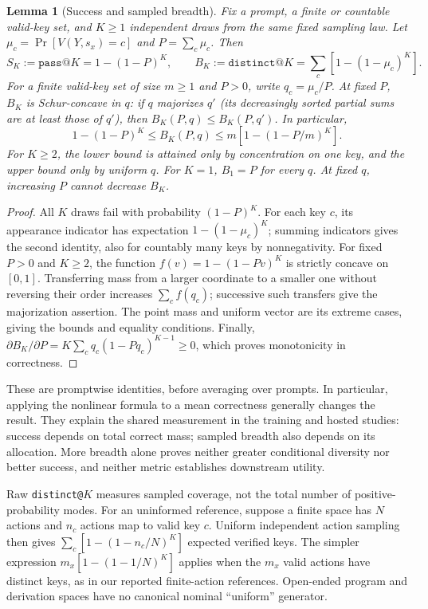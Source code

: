 \documentclass{article}
\newcommand{\1}{\mathbf 1}
\newtheorem{lemma}{Lemma}[section]
\theoremstyle{remark}
\theoremstyle{definition}
\theoremstyle{plain}
\begin{document}
\begin{lemma}[Success and sampled breadth]
\label{lem:success-breadth}
Fix a prompt, a finite or countable valid-key set, and $K\ge1$ independent
draws from the same fixed sampling law. Let
$\mu_c=\Pr[V(Y,s_x)=c]$ and $P=\sum_c\mu_c$. Then
\begin{equation}
 S_K:=\texttt{pass@}K=1-(1-P)^K,\qquad
 B_K:=\texttt{distinct@}K=\sum_c[1-(1-\mu_c)^K].
 \label{eq:success-breadth-identities}
\end{equation}
For a finite valid-key set of size $m\ge1$ and $P>0$, write $q_c=\mu_c/P$.
At fixed $P$, $B_K$ is Schur-concave in $q$: if $q$ majorizes $q'$
(its decreasingly sorted partial sums are at least those of $q'$), then
$B_K(P,q)\le B_K(P,q')$. In particular,
\begin{equation}
 1-(1-P)^K\le B_K(P,q)\le m[1-(1-P/m)^K].
 \label{eq:fixed-success-breadth-bounds}
\end{equation}
For $K\ge2$, the lower bound is attained only by concentration on one key,
and the upper bound only by uniform $q$. For $K=1$, $B_1=P$ for every $q$.
At fixed $q$, increasing $P$ cannot decrease $B_K$.
\end{lemma}
\begin{proof}
All $K$ draws fail with probability $(1-P)^K$. For each key $c$, its
appearance indicator has expectation $1-(1-\mu_c)^K$; summing indicators
gives the second identity, also for countably many keys by nonnegativity.
For fixed $P>0$ and $K\ge2$, the function
$f(v)=1-(1-Pv)^K$ is strictly concave on $[0,1]$.
Transferring mass from a larger coordinate to a smaller one without reversing
their order increases $\sum_c f(q_c)$; successive such transfers give the
majorization assertion. The point mass and uniform vector are its extreme
cases, giving the bounds and equality conditions. Finally,
$\partial B_K/\partial P=K\sum_c q_c(1-Pq_c)^{K-1}\ge0$,
which proves monotonicity in correctness.
\end{proof}

These are promptwise identities, before averaging over prompts. In particular,
applying the nonlinear formula to a mean correctness generally changes the
result. They explain the shared measurement in the training and hosted
studies: success depends on total correct mass; sampled breadth also depends
on its allocation. More breadth alone proves neither greater conditional
diversity nor better success, and neither metric establishes downstream utility.

Raw \texttt{distinct@}$K$ measures sampled coverage, not the total number of
positive-probability modes. For an uninformed reference, suppose a finite
space has $N$ actions and $n_c$ actions map to valid key $c$. Uniform independent
action sampling then gives $\sum_c[1-(1-n_c/N)^K]$ expected verified keys.
The simpler expression $m_x[1-(1-1/N)^K]$ applies when the $m_x$ valid actions
have distinct keys, as in our reported finite-action references.
Open-ended program and derivation spaces have no canonical nominal
``uniform'' generator.
\end{document}
